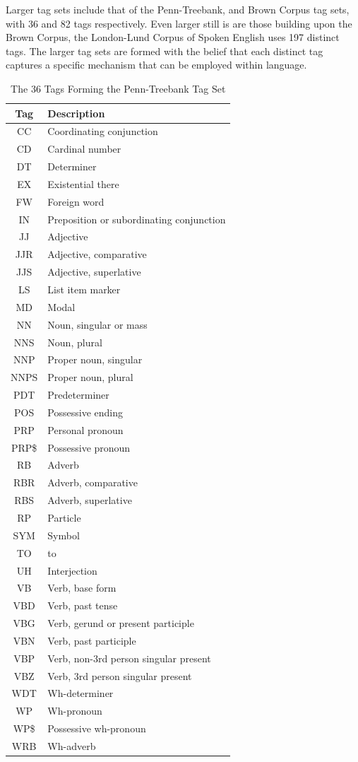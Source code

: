 \documentclass[10pt]{report}
\begin{document}
Larger tag sets include that of the Penn-Treebank, and Brown Corpus tag sets, with 36 and 82 tags respectively. Even larger still is are those building upon the Brown Corpus, the London-Lund Corpus
of Spoken English uses 197 distinct tags. The larger tag sets are formed with the belief that each distinct tag captures a specific mechanism that can be employed within language. ~\cite{that paper comparing tagsets.}


\renewcommand{\baselinestretch}{1.0}\normalsize
\renewcommand{\arraystretch}{1.0}
\begin{table}[h!]
  \centering
  \begin{tabular}{c | l}
       Tag & Description
       \\\hline
          CC	&Coordinating conjunction
	\\CD	&Cardinal number
	\\DT	&Determiner
	\\EX	&Existential there
	\\FW	&Foreign word
        \\IN	&Preposition or subordinating conjunction
	\\JJ	&Adjective
	\\JJR	&Adjective, comparative
        \\JJS	&Adjective, superlative
	\\LS	&List item marker
	\\MD	&Modal
	\\NN	&Noun, singular or mass
	\\NNS	&Noun, plural
	\\NNP	&Proper noun, singular
	\\NNPS	&Proper noun, plural
	\\PDT	&Predeterminer
	\\POS	&Possessive ending
	\\PRP	&Personal pronoun
	\\PRP\$	&Possessive pronoun
	\\RB	&Adverb
	\\RBR	&Adverb, comparative
	\\RBS	&Adverb, superlative
	\\RP	&Particle
	\\SYM	&Symbol
	\\TO	&to
	\\UH	&Interjection
	\\VB	&Verb, base form
	\\VBD	&Verb, past tense
	\\VBG	&Verb, gerund or present participle
	\\VBN	&Verb, past participle
	\\VBP	&Verb, non-3rd person singular present
	\\VBZ	&Verb, 3rd person singular present
	\\WDT	&Wh-determiner
	\\WP	&Wh-pronoun
	\\WP\$	&Possessive wh-pronoun
	\\WRB	&Wh-adverb
  \end{tabular}
  \caption{The 36 Tags Forming the Penn-Treebank Tag Set\label{tab:penn_treebank_tags}}
\end{table}
\end{document}
